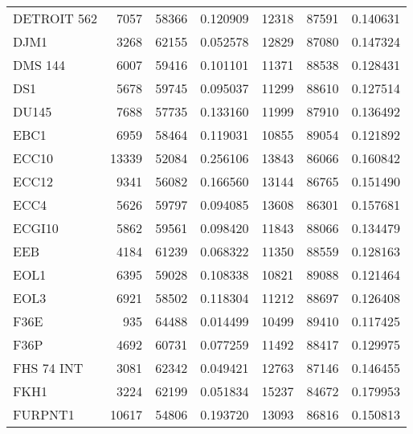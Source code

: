 \begin{tabular}{lrrrrrr}
                          DETROIT 562 &      7057 &    58366 &  0.120909 &     12318 &    87591 &  0.140631 \\
                                 DJM1 &      3268 &    62155 &  0.052578 &     12829 &    87080 &  0.147324 \\
                              DMS 144 &      6007 &    59416 &  0.101101 &     11371 &    88538 &  0.128431 \\
                                  DS1 &      5678 &    59745 &  0.095037 &     11299 &    88610 &  0.127514 \\
                                DU145 &      7688 &    57735 &  0.133160 &     11999 &    87910 &  0.136492 \\
                                 EBC1 &      6959 &    58464 &  0.119031 &     10855 &    89054 &  0.121892 \\
                                ECC10 &     13339 &    52084 &  0.256106 &     13843 &    86066 &  0.160842 \\
                                ECC12 &      9341 &    56082 &  0.166560 &     13144 &    86765 &  0.151490 \\
                                 ECC4 &      5626 &    59797 &  0.094085 &     13608 &    86301 &  0.157681 \\
                               ECGI10 &      5862 &    59561 &  0.098420 &     11843 &    88066 &  0.134479 \\
                                  EEB &      4184 &    61239 &  0.068322 &     11350 &    88559 &  0.128163 \\
                                 EOL1 &      6395 &    59028 &  0.108338 &     10821 &    89088 &  0.121464 \\
                                 EOL3 &      6921 &    58502 &  0.118304 &     11212 &    88697 &  0.126408 \\
                                 F36E &       935 &    64488 &  0.014499 &     10499 &    89410 &  0.117425 \\
                                 F36P &      4692 &    60731 &  0.077259 &     11492 &    88417 &  0.129975 \\
                           FHS 74 INT &      3081 &    62342 &  0.049421 &     12763 &    87146 &  0.146455 \\
                                 FKH1 &      3224 &    62199 &  0.051834 &     15237 &    84672 &  0.179953 \\
                              FURPNT1 &     10617 &    54806 &  0.193720 &     13093 &    86816 &  0.150813 \\

\end{tabular}
